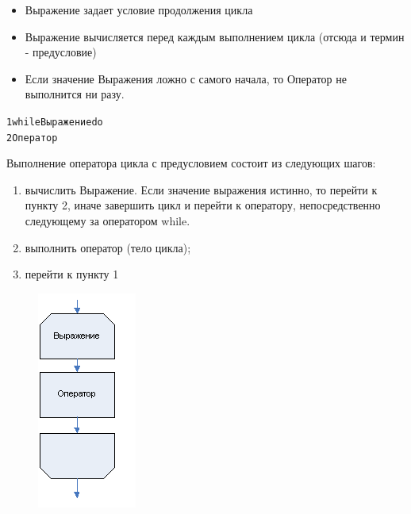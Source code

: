 \documentclass{beamer}
\begin{document}
\begin{frame}[fragile]
\begin{itemize}
\item Выражение задает условие продолжения цикла
\item Выражение вычисляется перед каждым выполнением цикла (отсюда и термин - предусловие)
\item Если значение Выражения ложно с самого начала, то Оператор не выполнится ни разу.
\end{itemize}
\begin{alltt}
1 while Выражение do
2   Оператор
\end{alltt}
\begin{minipage}{0.6\textwidth}
\begin{flushleft}
Выполнение оператора цикла с предусловием состоит из следующих шагов:
\begin{enumerate}
\item вычислить Выражение. Если значение выражения истинно, то перейти к пункту 2, иначе завершить цикл и перейти к оператору, непосредственно следующему за оператором while. 
\item выполнить оператор (тело цикла);
\item перейти к пункту 1
\end{enumerate}
\end{flushleft}
\end{minipage}
\begin{minipage}{0.2\textwidth}
\begin{flushright}
\begin{figure}[h]
\includegraphics[scale=0.6]{images/lec04-pic08.png}
\end{figure}
\end{flushright}
\end{minipage}
\end{frame}
\end{document}
